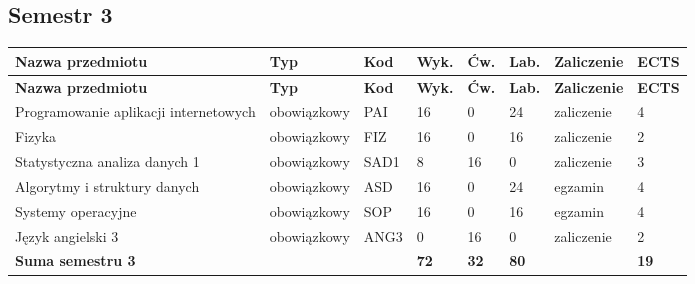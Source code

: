 \documentclass[12pt,a4paper]{article}
\newcommand{\thdrule}{\noalign{\global\setlength{\extrarowheight}{0pt}}}
\newcommand{\thdend}{\noalign{\global\setlength{\extrarowheight}{4pt}}}
\begin{document}
\subsection*{Semestr 3}

{\scriptsize
\begin{longtable}{m{5.0cm}m{1.9cm}m{0.75cm}m{0.85cm}m{0.85cm}m{0.85cm}m{1.45cm}m{0.9cm}}
\thdrule\toprule
\rowcolor{pjatkRed}
{\color{white}\footnotesize\textbf{\vphantom{Ag}Nazwa przedmiotu}} & {\color{white}\footnotesize\textbf{\vphantom{Ag}Typ}} & {\color{white}\footnotesize\textbf{\vphantom{Ag}Kod}} & {\color{white}\footnotesize\textbf{\vphantom{Ag}Wyk.}} & {\color{white}\footnotesize\textbf{\vphantom{Ag}Ćw.}} & {\color{white}\footnotesize\textbf{\vphantom{Ag}Lab.}} & {\color{white}\footnotesize\textbf{\vphantom{Ag}Zaliczenie}} & {\color{white}\footnotesize\textbf{\vphantom{Ag}ECTS}} \\
\midrule\thdend
\endfirsthead
\thdrule\toprule
\rowcolor{pjatkRed}
{\color{white}\footnotesize\textbf{\vphantom{Ag}Nazwa przedmiotu}} & {\color{white}\footnotesize\textbf{\vphantom{Ag}Typ}} & {\color{white}\footnotesize\textbf{\vphantom{Ag}Kod}} & {\color{white}\footnotesize\textbf{\vphantom{Ag}Wyk.}} & {\color{white}\footnotesize\textbf{\vphantom{Ag}Ćw.}} & {\color{white}\footnotesize\textbf{\vphantom{Ag}Lab.}} & {\color{white}\footnotesize\textbf{\vphantom{Ag}Zaliczenie}} & {\color{white}\footnotesize\textbf{\vphantom{Ag}ECTS}} \\
\midrule\thdend
\endhead
\rowcolor{tableRowLight} Programowanie aplikacji internetowych & {\scriptsize obowiązkowy} & PAI & 16 & 0 & 24 & {\scriptsize zaliczenie} & 4 \\
\rowcolor{tableRowAlt} Fizyka & {\scriptsize obowiązkowy} & FIZ & 16 & 0 & 16 & {\scriptsize zaliczenie} & 2 \\
\rowcolor{tableRowLight} Statystyczna analiza danych 1 & {\scriptsize obowiązkowy} & SAD1 & 8 & 16 & 0 & {\scriptsize zaliczenie} & 3 \\
\rowcolor{tableRowAlt} Algorytmy i struktury danych & {\scriptsize obowiązkowy} & ASD & 16 & 0 & 24 & {\scriptsize egzamin} & 4 \\
\rowcolor{tableRowLight} Systemy operacyjne & {\scriptsize obowiązkowy} & SOP & 16 & 0 & 16 & {\scriptsize egzamin} & 4 \\
\rowcolor{tableRowAlt} Język angielski 3 & {\scriptsize obowiązkowy} & ANG3 & 0 & 16 & 0 & {\scriptsize zaliczenie} & 2 \\
\midrule[\heavyrulewidth]
\rowcolor{tableSummary} \textbf{Suma semestru 3} & & & \textbf{72} & \textbf{32} & \textbf{80} & & \textbf{19} \\
\bottomrule
\end{longtable}}
\end{document}
